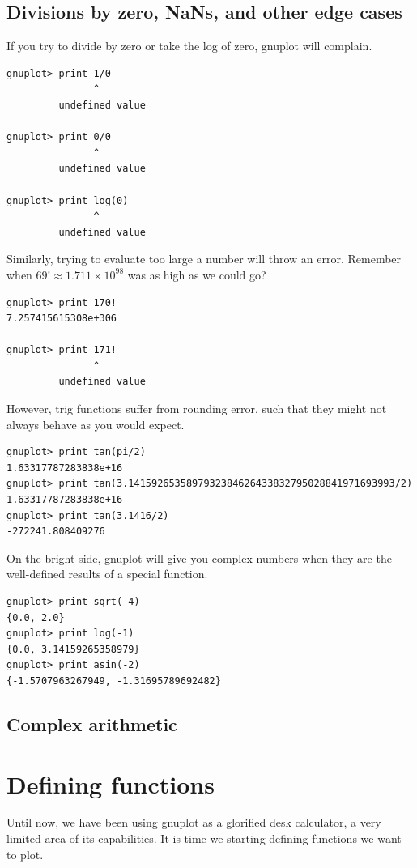 \documentclass[11pt,letterpaper]{report}
\begin{document}
\section{Divisions by zero, NaNs, and other edge cases}
If you try to divide by zero or take the log of zero,  gnuplot will complain.
\begin{lstlisting}
gnuplot> print 1/0
               ^
         undefined value

gnuplot> print 0/0
               ^
         undefined value
         
gnuplot> print log(0)
               ^
         undefined value

\end{lstlisting}

Similarly, trying to evaluate too large a number will throw an error. Remember when $69! \approx 1.711 \times 10^{98}$ was as high as we could go?
\begin{lstlisting}
gnuplot> print 170!
7.257415615308e+306

gnuplot> print 171!
               ^
         undefined value
\end{lstlisting}

However, trig functions suffer from rounding error, such that they might not always behave as you would expect.
\begin{lstlisting}
gnuplot> print tan(pi/2)
1.63317787283838e+16
gnuplot> print tan(3.1415926535897932384626433832795028841971693993/2)
1.63317787283838e+16
gnuplot> print tan(3.1416/2)
-272241.808409276
\end{lstlisting}

On the bright side, gnuplot will give you complex numbers when they are the well-defined results of a special function.
\begin{lstlisting}
gnuplot> print sqrt(-4)
{0.0, 2.0}
gnuplot> print log(-1)
{0.0, 3.14159265358979}
gnuplot> print asin(-2)
{-1.5707963267949, -1.31695789692482}
\end{lstlisting}

\section{Complex arithmetic}


\chapter{Defining functions}
Until now, we have been using gnuplot as a glorified desk calculator, a very limited area of its capabilities. It is time we starting defining functions we want to plot.
\end{document}
